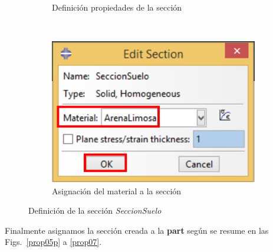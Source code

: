 \begin{figure}[!h]
\begin{subfigure}[!h]{0.39\textwidth}
      \caption{Definición propiedades de la sección}
      \label{prop04}
    \end{subfigure}%
    ~ %
    \begin{subfigure}[!h]{0.39\textwidth}
      \includegraphics[width=\textwidth]{./body/images/prop05.pdf}
      \caption{Asignación del material a la sección}
      \label{prop05}
    \end{subfigure}%
    \caption{Definición de la sección \textit{SeccionSuelo}}
  \end{figure}

  Finalmente asignamos la sección creada a la \textbf{part} según se
  resume en las Figs.~\ref{prop05p} a \ref{prop07}.

